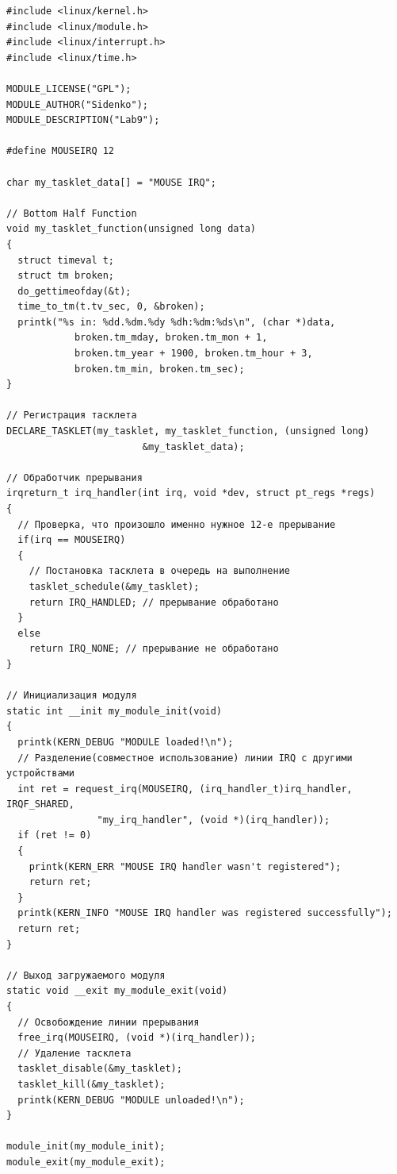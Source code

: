 \documentclass[a4paper,14pt]{extreport} %
\begin{document}
\begin{lstlisting}
#include <linux/kernel.h>
#include <linux/module.h>
#include <linux/interrupt.h>
#include <linux/time.h>

MODULE_LICENSE("GPL");
MODULE_AUTHOR("Sidenko");
MODULE_DESCRIPTION("Lab9");

#define MOUSEIRQ 12

char my_tasklet_data[] = "MOUSE IRQ";

// Bottom Half Function
void my_tasklet_function(unsigned long data)
{
  struct timeval t;
  struct tm broken;
  do_gettimeofday(&t);
  time_to_tm(t.tv_sec, 0, &broken);
  printk("%s in: %dd.%dm.%dy %dh:%dm:%ds\n", (char *)data,
			broken.tm_mday, broken.tm_mon + 1,
			broken.tm_year + 1900, broken.tm_hour + 3,
			broken.tm_min, broken.tm_sec);
}

// Регистрация тасклета
DECLARE_TASKLET(my_tasklet, my_tasklet_function, (unsigned long)
						&my_tasklet_data);

// Обработчик прерывания
irqreturn_t irq_handler(int irq, void *dev, struct pt_regs *regs)
{
  // Проверка, что произошло именно нужное 12-е прерывание
  if(irq == MOUSEIRQ)
  {
    // Постановка тасклета в очередь на выполнение
    tasklet_schedule(&my_tasklet);
    return IRQ_HANDLED; // прерывание обработано
  }
  else
    return IRQ_NONE; // прерывание не обработано
}

// Инициализация модуля
static int __init my_module_init(void)
{
  printk(KERN_DEBUG "MODULE loaded!\n");
  // Разделение(совместное использование) линии IRQ с другими устройствами
  int ret = request_irq(MOUSEIRQ, (irq_handler_t)irq_handler, IRQF_SHARED,
				"my_irq_handler", (void *)(irq_handler));
  if (ret != 0)
  {
    printk(KERN_ERR "MOUSE IRQ handler wasn't registered");
    return ret;
  }
  printk(KERN_INFO "MOUSE IRQ handler was registered successfully");
  return ret;
}

// Выход загружаемого модуля
static void __exit my_module_exit(void)
{
  // Освобождение линии прерывания
  free_irq(MOUSEIRQ, (void *)(irq_handler));
  // Удаление тасклета
  tasklet_disable(&my_tasklet);
  tasklet_kill(&my_tasklet);
  printk(KERN_DEBUG "MODULE unloaded!\n");
}

module_init(my_module_init);
module_exit(my_module_exit);
\end{lstlisting}
\end{document}
